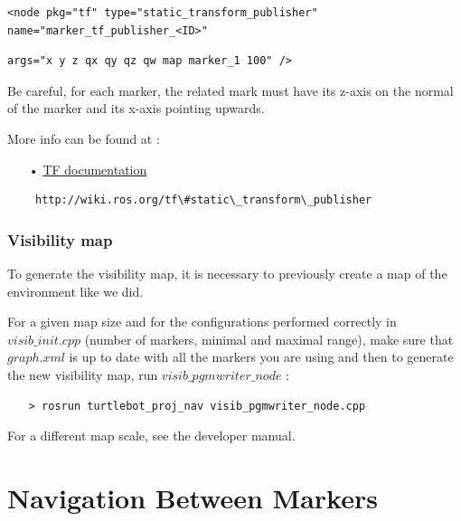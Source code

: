 \documentclass[10pt,a4paper]{article}
\begin{document}
\begin{verbatim}
<node pkg="tf" type="static_transform_publisher" name="marker_tf_publisher_<ID>" 
\end{verbatim}
\begin{verbatim}
args="x y z qx qy qz qw map marker_1 100" />
\end{verbatim}

Be careful, for each marker, the related mark must have its z-axis on the normal of the marker and its x-axis pointing upwards. 

More info can be found at :

\begin{itemize}
\item[•] \href{http://wiki.ros.org/tf\#static\_transform\_publisher}{TF documentation} 
\item[ ] \begin{verbatim} http://wiki.ros.org/tf\#static\_transform\_publisher \end{verbatim}
\end{itemize}

\subsubsection{Visibility map}
\label{sec:visibilityMap}

To generate the visibility map, it is necessary to previously create a map of the environment like we did.

For a given map size and for the configurations performed correctly in $ visib\_init.cpp$ (number of markers, minimal and maximal range), make sure that $graph.xml$ is up to date with all the markers you are using and then to generate the new visibility map, run $visib\_pgmwriter\_node$ :

\begin{itemize}
\item[]  \begin{verbatim}> rosrun turtlebot_proj_nav visib_pgmwriter_node.cpp \end{verbatim}
\end{itemize}

For a different map scale, see the developer manual.

\newpage
\section{Navigation Between Markers}
\label{sec:Navigation Between Markers}
\end{document}
